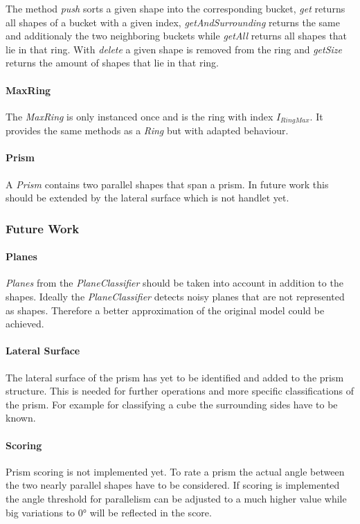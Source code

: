 \documentclass[../ClassicThesis.tex]{subfiles}
\begin{document}
The method \emph{push} sorts a given shape into the corresponding bucket, \emph{get} returns all shapes of a bucket with a given index, \emph{getAndSurrounding} returns the same and additionaly the two neighboring buckets while \emph{getAll} returns all shapes that lie in that ring. With \emph{delete} a given shape is removed from the ring and \emph{getSize} returns the amount of shapes that lie in that ring.


\paragraph{MaxRing} The \emph{MaxRing} is only instanced once and is the ring with index $ I_{RingMax} $. It provides the same methods as a \emph{Ring} but with adapted behaviour.

\paragraph{Prism}

A \emph{Prism} contains two parallel shapes that span a prism. In future work this should be extended by the lateral surface which is not handlet yet.

\subsubsection{Future Work}
\label{sec:PrismFutureWork}

\paragraph{Planes} \emph{Planes} from the \emph{PlaneClassifier} should be taken into account in addition to the shapes. Ideally the \emph{PlaneClassifier} detects noisy planes that are not represented as shapes. Therefore a better approximation of the original model could be achieved.

\paragraph{Lateral Surface} The lateral surface of the prism has yet to be identified and added to the prism structure. This is needed for further operations and more specific classifications of the prism. For example for classifying a cube the surrounding sides have to be known.

\paragraph{Scoring} Prism scoring is not implemented yet. To rate a prism the actual angle between the two nearly parallel shapes have to be considered. If scoring is implemented the angle threshold for parallelism can be adjusted to a much higher value while big variations to 0° will be reflected in the score.
\end{document}
